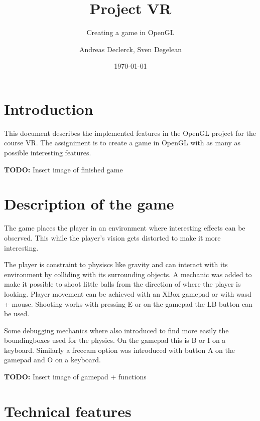 \documentclass[]{article}
\title{Project VR}
\subtitle{Creating a game in OpenGL}
\author{Andreas Declerck, Sven Degelean}
\date{\today}
\newcommand*{\TODO}{\textbf{TODO: }}
\begin{document}
\maketitle

\section{Introduction}

This document describes the implemented features in the OpenGL project for the
course VR. The assigniment is to create a game in OpenGL with as many as possible
interesting features.

\TODO Insert image of finished game

\section{Description of the game}

The game places the player in an environment where interesting effects can be
observed. This while the player's vision gets distorted to make it more
interesting.

The player is constraint to physiscs like gravity and can interact with its
environment by colliding with its surrounding objects. A mechanic was added
to make it possible to shoot little balls from the direction of where the
player is looking. Player movement can be achieved with an XBox gamepad or with
wasd + mouse. Shooting works with pressing E or on the gamepad the LB
button can be used.

Some debugging mechanics where also introduced to find more easily the
boundingboxes used for the physics. On the gamepad this is B or I on a keyboard.
Similarly a freecam option was introduced with button A on the gamepad and O on
a keyboard.

\TODO Insert image of gamepad + functions

\section{Technical features}
\end{document}
